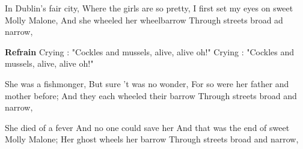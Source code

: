 \footnotemark [
ititle={Cockles and mussels}]


\beginverse
In Dublin's fair city,
Where the girls are so pretty,
I first set my eyes on sweet Molly Malone,
And she wheeled her wheelbarrow
Through streets broad ad narrow,
\endverse

\beginchorus
\textbf{Refrain}
Crying : "Cockles and mussels, alive, alive oh!"
Crying : "Cockles and mussels, alive, alive oh!"
\endchorus

\beginverse
She was a fishmonger,
But sure 't was no wonder,
For so were her father and mother before;
And they each wheeled their barrow
Through streets broad and narrow,
\endverse

\beginverse
She died of a fever
And no one could save her
And that was the end of sweet Molly Malone;
Her ghost wheels her barrow
Through streets broad and narrow,
\endverse
\endsong